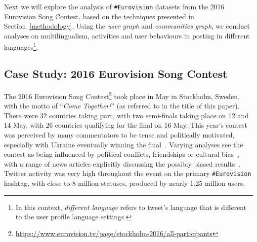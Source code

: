 \documentclass{llncs}
\begin{document}

Next we will explore the analysis of {\texttt{\#Eurovision}} datasets
from the 2016 Eurovision Song Contest, based on the techniques
presented in Section~\ref{methodology}. Using the \emph{user graph}
and \emph{communities graph}, we conduct analyses on multilingualism,
activities and user behaviours in posting in different
languages\footnote{In this context, \emph{different language} refers
to tweet's language that is different to the user profile language
settings.}.

\subsection{Case Study: 2016 Eurovision Song Contest}\label{context}

The 2016 Eurovision Song
Contest\footnote{\url{https://www.eurovision.tv/page/stockholm-2016/all-participants}}
took place in May in Stockholm, Sweden, with the motto of
``{\emph{Come Together!}}'' (as referred to in the title of this
paper). There were 32 countries taking part, with two semi-finals
taking place on 12 and 14 May, with 26 countries qualifying for the
final on 16 May. This year's contest was perceived by many
commentators to be tense and politically motivated, especially with
Ukraine eventually winning the
final~\cite{telegrapheuroboycott:2016}. Varying analyses see the
contest as being influenced by political conflicts, friendships or
cultural
bias~\cite{ginsburgh+noury:2008,charron:2013,blangiardo+baio:2014,budzinski+pannicke:2016},
with a range of news articles explicitly discussing the possibly
biased results~\cite{telegrapheurobias:2016}.  Twitter activity was
very high throughout the event on the primary {\texttt{\#Eurovision}}
hashtag, with close to 8 million statuses, produced by nearly 1.25
million users.
\end{document}
